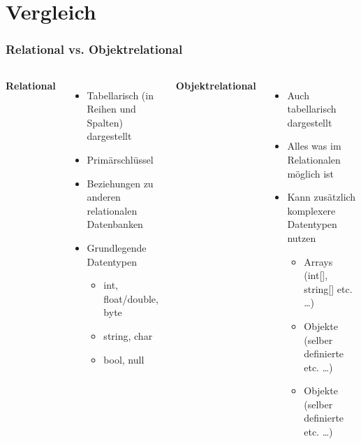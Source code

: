 \section{Vergleich}

\begin{frame}
    \frametitle{Relational vs. Objektrelational}
    \pause
    \begin{columns}[T,onlytextwidth]
            \textbf{Relational}
            \pause
            \begin{itemize}
                \item Tabellarisch (in Reihen und Spalten) dargestellt \pause
                \item Primärschlüssel \pause
                \item Beziehungen zu anderen relationalen Datenbanken \pause
                \item Grundlegende Datentypen \pause
                \begin{itemize}
                    \item int, float/double, byte \pause
                    \item string, char \pause
                    \item bool, null \pause
                \end{itemize}
            \end{itemize}

            \textbf{Objektrelational}
            \pause
            \begin{itemize}
                \item Auch tabellarisch dargestellt
                \item Alles was im Relationalen möglich ist \pause
                \item Kann zusätzlich komplexere Datentypen nutzen \pause
                \begin{itemize}
                    \item Arrays (int[], string[] etc. \dots) \pause
                    \item Objekte (selber definierte etc. \dots) \pause
                    \item Objekte (selber definierte etc. \dots) \pause
                \end{itemize}
            \end{itemize}
    \end{columns}
\end{frame}

